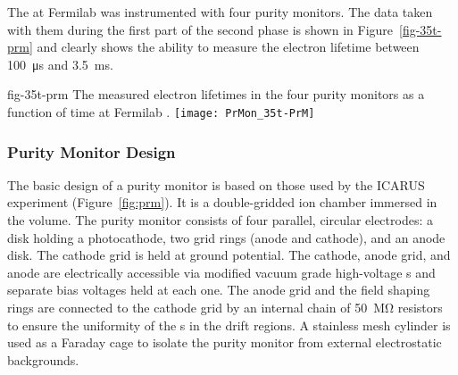 The %
 at Fermilab was instrumented with four purity monitors. The data taken with them during the first part of the second phase is shown in Figure~\ref{fig-35t-prm} and clearly shows the ability to measure the electron lifetime between \SI{100}{\micro\second} and \SI{3.5}{\milli\second}.  

\begin{dunefigure}{fig-35t-prm}
  {The measured electron lifetimes in the four purity monitors as a function of time at Fermilab .}
  \texttt{[image: PrMon\_35t-PrM]}%
\end{dunefigure}


\subsubsection{Purity Monitor Design}

The basic design of a purity monitor is based on those used by the ICARUS experiment (Figure~\ref{fig:prm})\cite{Adamowski:2014daa}. It is a double-gridded ion chamber immersed in the \lar volume.   The purity monitor consists of four parallel, circular electrodes: a disk holding a photocathode, two grid rings (anode and cathode), and an anode disk. The cathode grid is held at ground potential. The cathode, anode grid, and anode are electrically accessible via modified vacuum grade high-voltage \fdth{}s and separate bias voltages held at each one.  
The anode grid and the field shaping rings are connected to the cathode grid by an internal chain of \SI{50}{\mega\ohm} resistors to ensure the uniformity of the \efield{}s in the drift regions. A stainless mesh cylinder is used as a Faraday cage to isolate the purity monitor from external electrostatic backgrounds. 


